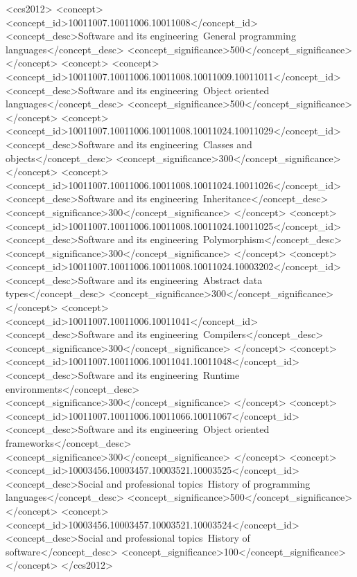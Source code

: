 \documentclass[acmsmall,screen]{acmart}
\begin{document}
\begin{CCSXML}
<ccs2012>
    <concept>
        <concept_id>10011007.10011006.10011008</concept_id>
        <concept_desc>Software and its engineering~General programming languages</concept_desc>
        <concept_significance>500</concept_significance>
        </concept>
<concept>
   <concept>
       <concept_id>10011007.10011006.10011008.10011009.10011011</concept_id>
       <concept_desc>Software and its engineering~Object oriented languages</concept_desc>
       <concept_significance>500</concept_significance>
       </concept>
   <concept>
       <concept_id>10011007.10011006.10011008.10011024.10011029</concept_id>
       <concept_desc>Software and its engineering~Classes and objects</concept_desc>
       <concept_significance>300</concept_significance>
       </concept>
   <concept>
       <concept_id>10011007.10011006.10011008.10011024.10011026</concept_id>
       <concept_desc>Software and its engineering~Inheritance</concept_desc>
       <concept_significance>300</concept_significance>
       </concept>
   <concept>
       <concept_id>10011007.10011006.10011008.10011024.10011025</concept_id>
       <concept_desc>Software and its engineering~Polymorphism</concept_desc>
       <concept_significance>300</concept_significance>
       </concept>
   <concept>
       <concept_id>10011007.10011006.10011008.10011024.10003202</concept_id>
       <concept_desc>Software and its engineering~Abstract data types</concept_desc>
       <concept_significance>300</concept_significance>
       </concept>
   <concept>
       <concept_id>10011007.10011006.10011041</concept_id>
       <concept_desc>Software and its engineering~Compilers</concept_desc>
       <concept_significance>300</concept_significance>
       </concept>
   <concept>
       <concept_id>10011007.10011006.10011041.10011048</concept_id>
       <concept_desc>Software and its engineering~Runtime environments</concept_desc>
       <concept_significance>300</concept_significance>
       </concept>
   <concept>
       <concept_id>10011007.10011006.10011066.10011067</concept_id>
       <concept_desc>Software and its engineering~Object oriented frameworks</concept_desc>
       <concept_significance>300</concept_significance>
       </concept>
   <concept>
       <concept_id>10003456.10003457.10003521.10003525</concept_id>
       <concept_desc>Social and professional topics~History of programming languages</concept_desc>
       <concept_significance>500</concept_significance>
       </concept>
   <concept>
       <concept_id>10003456.10003457.10003521.10003524</concept_id>
       <concept_desc>Social and professional topics~History of software</concept_desc>
       <concept_significance>100</concept_significance>
       </concept>
 </ccs2012>
\end{CCSXML}
\end{document}
